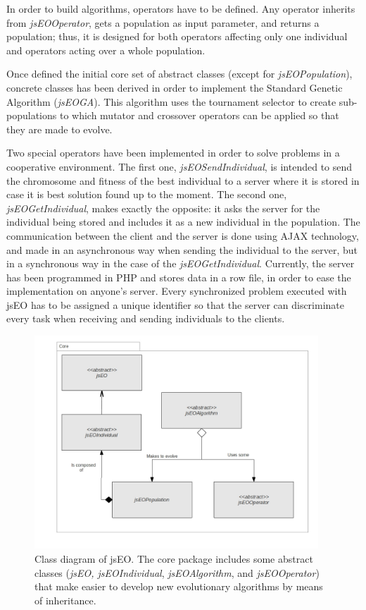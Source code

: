 \documentclass[runningheads,a4paper]{llncs}
\begin{document}
In order to build algorithms, operators have to be defined. Any operator inherits from \textit{jsEOOperator}, gets a population as input parameter, and returns a population; thus, it is designed for both operators affecting only one individual and operators acting over a whole population.

Once defined the initial core set of abstract classes (except for \textit{jsEOPopulation}), concrete classes has been derived in order to implement the Standard Genetic Algorithm (\textit{jsEOGA}). This algorithm uses the tournament selector to create sub-populations to which mutator and crossover operators can be applied so that they are made to evolve.

Two special operators have been implemented in order to solve problems in a cooperative environment. The first one, \textit{jsEOSendIndividual}, is intended to send the chromosome and fitness of the best individual to a server where it is stored in case it is best solution found up to the moment. The second one, \textit{jsEOGetIndividual}, makes exactly the opposite: it asks the server for the individual being stored and includes it as a new individual in the population. The communication between the client and the server is done using AJAX technology, and made in an asynchronous way when sending the individual to the server, but in a synchronous way in the case of the \textit{jsEOGetIndividual}. Currently, the server has been programmed in PHP and stores data in a row file, in order to ease the implementation on anyone's server. Every synchronized problem executed with jsEO has to be assigned a unique identifier so that the server can discriminate every task when receiving and sending individuals to the clients.

\begin{figure}
\centering
\includegraphics[height=8cm]{class-diagram}
\caption{Class diagram of jsEO. The core package includes some abstract classes (\textit{jsEO, jsEOIndividual}, \textit{jsEOAlgorithm}, and \textit{jsEOOperator}) that make easier to develop new evolutionary algorithms by means of inheritance.}
\label{fig:jsEO-class-diagram}
\end{figure}
\end{document}
